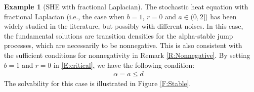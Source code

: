 \documentclass[a4paper,11pt]{article}
\numberwithin{equation}{section}
\numberwithin{equation}{section}
\theoremstyle{plain}
\theoremstyle{definition}
\newtheorem{example}[theorem]{Example}
\begin{document}
\begin{example}[SHE with fractional Laplacian] \label{Eg:StableSHE}
  The stochastic heat equation with fractional Laplacian (i.e., the case when $b=1$, $r=0$ and $a\in
  (0,2]$) has been widely studied in the literature, but possibly with different noises. In this
  case, the fundamental solutions are transition densities for the alpha-stable jump processes,
  which are necessarily to be nonnegative. This is also consistent with the sufficient conditions
  for nonnegativity in Remark \ref{R:Nonnegative}. By setting $b=1$ and $r=0$ in \eqref{E:critical},
  we have the following condition:
  \begin{align*}
    \alpha = a \le d
  \end{align*}
  The solvability for this case is illustrated in Figure \ref{F:Stable}.
\end{example}
\end{document}
